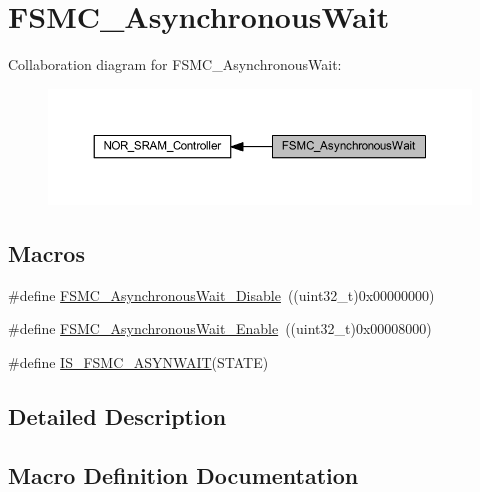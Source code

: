 \hypertarget{group___f_s_m_c___asynchronous_wait}{}\section{F\+S\+M\+C\+\_\+\+Asynchronous\+Wait}
\label{group___f_s_m_c___asynchronous_wait}
Collaboration diagram for F\+S\+M\+C\+\_\+\+Asynchronous\+Wait\+:
\nopagebreak
\begin{figure}[H]
\begin{center}
\leavevmode
\includegraphics[width=350pt]{group___f_s_m_c___asynchronous_wait}
\end{center}
\end{figure}
\subsection*{Macros}
\begin{DoxyCompactItemize}
\item 
\#define \hyperlink{group___f_s_m_c___asynchronous_wait_ga36c0dad6fe6c0e01632d3312c8f4c4cb}{F\+S\+M\+C\+\_\+\+Asynchronous\+Wait\+\_\+\+Disable}~((uint32\+\_\+t)0x00000000)
\item 
\#define \hyperlink{group___f_s_m_c___asynchronous_wait_gaff524bfa697106ede7d4b557a5ad7d8c}{F\+S\+M\+C\+\_\+\+Asynchronous\+Wait\+\_\+\+Enable}~((uint32\+\_\+t)0x00008000)
\item 
\#define \hyperlink{group___f_s_m_c___asynchronous_wait_ga52d579de825316ee058baf11bfb749d6}{I\+S\+\_\+\+F\+S\+M\+C\+\_\+\+A\+S\+Y\+N\+W\+A\+IT}(S\+T\+A\+TE)
\end{DoxyCompactItemize}


\subsection{Detailed Description}


\subsection{Macro Definition Documentation}
\mbox{\label{group___f_s_m_c___asynchronous_wait_ga36c0dad6fe6c0e01632d3312c8f4c4cb}} 
